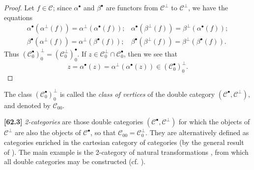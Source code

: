 \documentclass[a4paper,fleqn]{article}
\theoremstyle{plain}
\theoremstyle{definition}
\newenvironment{definition}[1]
  {\renewcommand\theinnerdefinition{#1}\innerdefinition}
  {\endinnerdefinition}
\newenvironment{longcomm}[1]
  {\noindent\textbf{[#1]}\rmfamily}
  {}
\newcommand{\oldpage}[1]{{\marginpar{\footnotesize$\bigg\vert$\,\,\,\,\textit{p.~#1}}}}
\newcommand{\CC}{\mathcal{C}}
\begin{document}
\begin{proof}
  Let $f\in\CC$;
  since $\alpha^\bullet$ and $\beta^\bullet$ are functors from $\CC^\perp$ to $\CC^\perp$, we have the equations
  \[
    \begin{array}{cc}
      \alpha^\bullet(\alpha^\perp(f))
      = \alpha^\perp(\alpha^\bullet(f));
      & \alpha^\bullet(\beta^\perp(f))
      = \beta^\perp(\alpha^\bullet(f));
    \\\beta^\bullet(\alpha^\perp(f))
      = \alpha^\perp(\beta^\bullet(f));
      & \beta^\bullet(\beta^\perp(f))
      = \beta^\perp(\beta^\bullet(f)).
    \end{array}
  \]
  Thus $(\CC_0^\bullet)_0^\perp=(\CC_0^\perp)_0^\bullet$.
  If $z\in\CC_0^\perp\cap\CC_0^\bullet$, then we see that
  \[
    z
    = \alpha^\bullet(z)
    = \alpha^\perp(\alpha^\bullet(z))
    \in (\CC_0^\bullet)_0^\perp.
  \]
\end{proof}

\begin{definition}{11}
\label{definition:ii-11}
  The class $(\CC_0^\bullet)_0^\perp$ is called the \emph{class of vertices} of the double category $(\CC^\bullet,\CC^\perp)$, and denoted by $\CC_{00}$.
\end{definition}

\begin{longcomm}{62.3}
  \emph{2-categories} are those double categories $(\CC^\bullet,\CC^\perp)$ for which the objects of $\CC^\perp$ are also the objects of $\CC^\bullet$, so that $\CC_{00}=\CC_0^\perp$.
  They are alternatively defined as categories enriched in the cartesian category of categories (by the general result of \cite[Appendix]{coll120}).
  The main example is the 2-category of natural transformations \cite{coll52}, from which all double categories may be constructed (cf. \cite[Comment~105.1]{coll64}).
\end{longcomm}

\oldpage{391}
\end{document}

